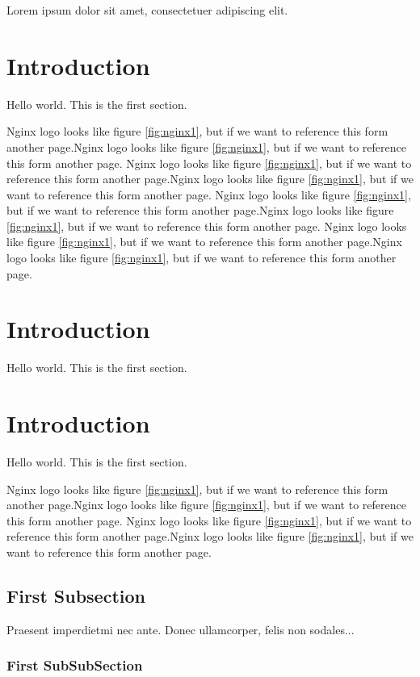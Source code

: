 \documentclass[10pt, a4paper]{article} %
\begin{document}
Lorem ipsum dolor sit amet, consectetuer adipiscing elit.

\section{Introduction}

Hello world. This is the first section.

Nginx logo looks like figure \ref{fig:nginx1}, but if we want to reference this form another page.Nginx logo looks like figure \ref{fig:nginx1}, but if we want to reference this form another page.
Nginx logo looks like figure \ref{fig:nginx1}, but if we want to reference this form another page.Nginx logo looks like figure \ref{fig:nginx1}, but if we want to reference this form another page.
Nginx logo looks like figure \ref{fig:nginx1}, but if we want to reference this form another page.Nginx logo looks like figure \ref{fig:nginx1}, but if we want to reference this form another page.
Nginx logo looks like figure \ref{fig:nginx1}, but if we want to reference this form another page.Nginx logo looks like figure \ref{fig:nginx1}, but if we want to reference this form another page.

\section{Introduction}

Hello world. This is the first section.
\section{Introduction}

Hello world. This is the first section.

Nginx logo looks like figure \ref{fig:nginx1}, but if we want to reference this form another page.Nginx logo looks like figure \ref{fig:nginx1}, but if we want to reference this form another page.
Nginx logo looks like figure \ref{fig:nginx1}, but if we want to reference this form another page.Nginx logo looks like figure \ref{fig:nginx1}, but if we want to reference this form another page.

\subsection{First Subsection}
Praesent imperdietmi nec ante. Donec ullamcorper, felis non sodales...

\subsubsection{First SubSubSection}
\end{document}

